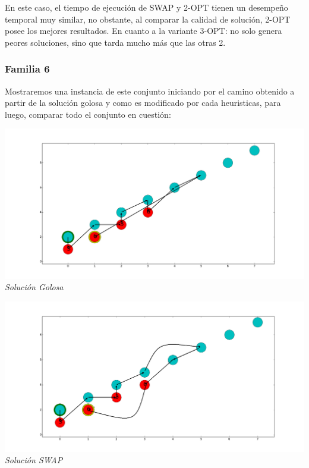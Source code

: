   
 En este caso, el tiempo de ejecuci\'on de SWAP y 2-OPT tienen un desempeño temporal muy similar, no obstante, al comparar la calidad de solución, 2-OPT posee los mejores resultados. En cuanto a la variante 3-OPT: no solo genera peores soluciones, sino que tarda mucho más que las otras 2. 


\subsubsection*{Familia 6}

Mostraremos una instancia de este conjunto iniciando por el camino obtenido a partir de la soluci\'on golosa y como es modificado por cada heuristicas, para luego, comparar todo el conjunto en cuesti\'on:

\vspace*{0.3cm} \vspace*{0.3cm}
  \begin{center}
 \includegraphics[scale=0.3]{./EJ3/sinOrdengoloso.png}\\
 {            \textit{Soluci\'on Golosa}}
  \end{center}
  \vspace*{0.3cm}

\vspace*{0.3cm} \vspace*{0.3cm}
  \begin{center}
 \includegraphics[scale=0.3]{./EJ3/sinOrdenswap.png}\\
 {            \textit{Soluci\'on SWAP}}
  \end{center}
  \vspace*{0.3cm}


